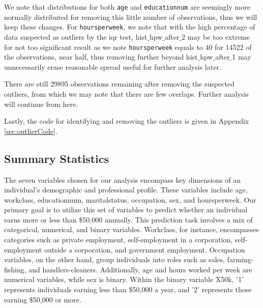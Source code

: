 \documentclass{article}
\begin{document}
    We note that distributions for both \texttt{age} and \texttt{educationnum} are seemingly more normally distributed for removing this little number of observations, thus we will keep these changes. For \texttt{hoursperweek}, we note that with the high percentage of data suspected as outliers by the iqr test, hist$\_$hpw$\_$after$\_$2 may be too extreme for not too significant result as we note \texttt{hoursperweek} equals to 40 for 14522 of the observations, near half, thus removing further beyond hist$\_$hpw$\_$after$\_$1 may unnecessarily erase reasonable spread useful for further analysis later.  

    There are still 29895 observations remaining after removing the suspected outliers, from which we may note that there are few overlaps. Further analysis will continue from here.
    
    Lastly, the code for identifying and removing the outliers is given in Appendix  \ref{sec:outlierCode}.
    
    \subsection{Summary Statistics}
    \hspace{\parindent} 

The seven variables chosen for our analysis encompass key dimensions of an individual's demographic and professional profile. These variables include age, workclass, educationnum, maritalstatus, occupation, sex, and hoursperweek. Our primary goal is to utilize this set of variables to predict whether an individual earns more or less than \$50,000 annually. This prediction task involves a mix of categorical, numerical, and binary variables. Workclass, for instance, encompasses categories such as private employment, self-employment in a corporation, self-employment outside a corporation, and government employment. Occupation variables, on the other hand, group individuals into roles such as sales, farming-fishing, and handlers-cleaners. Additionally, age and hours worked per week are numerical variables, while sex is binary. Within the binary variable X50k, '1' represents individuals earning less than \$50,000 a year, and '2' represents those earning \$50,000 or more.
\end{document}
